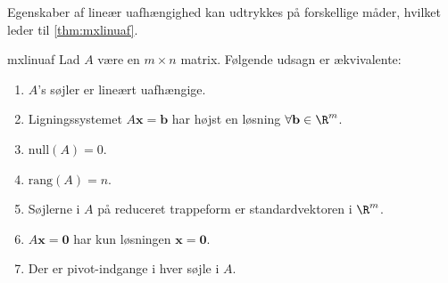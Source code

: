 %
%
%
Egenskaber af lineær uafhængighed kan udtrykkes på forskellige måder, hvilket leder til \ref{thm:mxlinuaf}.
%
\begin{thm}{}{mxlinuaf}
%
Lad $A$ være en $m \times n$ matrix.
Følgende udsagn er ækvivalente:
%
\begin{enumerate}[label=(\alph*)]
\item $A$'s søjler er lineært uafhængige. 
\item Ligningssystemet $A\mathbf{x}=\mathbf{b}$ har højst en løsning $\forall \mathbf{b} \in \R^m$.
\item $\text{null}(A)=0$.
\item $\text{rang}(A)=n$.
\item Søjlerne i $A$ på reduceret trappeform er standardvektoren i $\R^m$.
\item $A\mathbf{x}=\mathbf{0}$ har kun løsningen $\mathbf{x}=\mathbf{0}$.                                                                                                                                                                                                                                                                                                                         
\item Der er pivot-indgange i hver søjle i $A$. 
\end{enumerate}
%
\end{thm}
%
%
